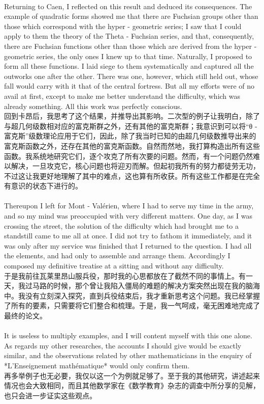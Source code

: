\documentclass{article}
\begin{document}
\\
Returning to Caen, I reflected on this result and deduced its consequences. The example of quadratic forms showed me that there are Fuchsian groups other than those which correspond with the hyper - geometric series; I saw that I could apply to them the theory of the Theta - Fuchsian series, and that, consequently, there are Fuchsian functions other than those which are derived from the hyper - geometric series, the only ones I knew up to that time. Naturally, I proposed to form all these functions. I laid siege to them systematically and captured all the outworks one after the other. There was one, however, which still held out, whose fall would carry with it that of the central fortress. But all my efforts were of no avail at first, except to make me better understand the difficulty, which was already something. All this work was perfectly conscious.\\
回到卡昂后，我思考了这个结果，并推导出其影响。二次型的例子让我明白，除了与超几何级数相对应的富克斯群之外，还有其他的富克斯群；我意识到可以将“θ - 富克斯”级数理论应用于它们，因此，除了我当时已知的由超几何级数推导出来的富克斯函数之外，还存在其他的富克斯函数。自然而然地，我打算构造出所有这些函数。我系统地研究它们，逐个攻克了所有次要的问题。然而，有一个问题仍然难以解决，一旦攻克它，核心问题也将迎刃而解。但起初我所有的努力都徒劳无功，不过这让我更好地理解了其中的难点，这也算有所收获。所有这些工作都是在完全有意识的状态下进行的。 \\

\\
Thereupon I left for Mont - Valérien, where I had to serve my time in the army, and so my mind was preoccupied with very different matters. One day, as I was crossing the street, the solution of the difficulty which had brought me to a standstill came to me all at once. I did not try to fathom it immediately, and it was only after my service was finished that I returned to the question. I had all the elements, and had only to assemble and arrange them. Accordingly I composed my definitive treatise at a sitting and without any difficulty.\\
于是我前往瓦莱里昂山服兵役，那时我的心思都放在了截然不同的事情上。有一天，我过马路的时候，那个曾让我陷入僵局的难题的解决方案突然出现在我的脑海中。我没有立刻深入探究，直到兵役结束后，我才重新思考这个问题。我已经掌握了所有的要素，只需要将它们整合和梳理。于是，我一气呵成，毫无困难地完成了最终的论文。 \\

\\
It is useless to multiply examples, and I will content myself with this one alone. As regards my other researches, the accounts I should give would be exactly similar, and the observations related by other mathematicians in the enquiry of *L'Enseignement mathématique* would only confirm them.\\
再多举例子也无必要，我仅以这一个为例就足够了。至于我的其他研究，讲述起来情况也会大致相同，而且其他数学家在《数学教育》杂志的调查中所分享的见解，也只会进一步证实这些观点。 \\ 
\end{document}
